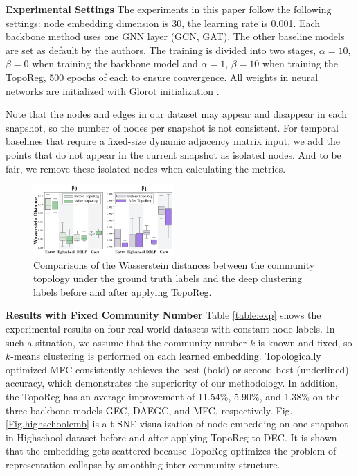 \documentclass[letterpaper]{article} %
\begin{document}
\noindent\textbf{Experimental Settings} The experiments in this paper follow the following settings: node embedding dimension is 30, the learning rate is 0.001. Each backbone method uses one GNN layer (GCN, GAT). The other baseline models are set as default by the authors. The training is divided into two stages, $\alpha=10$, $\beta=0$ when training the backbone model and $\alpha=1$, $\beta=10$ when training the TopoReg, 500 epochs of each to ensure convergence. All weights in neural networks are initialized with Glorot initialization \cite{glorotinit}.

Note that the nodes and edges in our dataset may appear and disappear in each snapshot, so the number of nodes per snapshot is not consistent. For temporal baselines that require a fixed-size dynamic adjacency matrix input, we add the points that do not appear in the current snapshot as isolated nodes. And to be fair, we remove these isolated nodes when calculating the metrics.

\begin{figure}[]
\centering %
\includegraphics[width=0.48\textwidth]{pic/boxplot_v2.pdf} %
\caption{Comparisons of the Wasserstein distances between the community topology under the ground truth labels and the deep clustering labels before and after applying TopoReg.} %
\label{Fig.topo_shift} %
\end{figure}

\noindent\textbf{Results with Fixed Community Number} Table \ref{table:exp} shows the experimental results on four real-world datasets with constant node labels. In such a situation, we assume that the community number $k$ is known and fixed, so $k$-means clustering is performed on each learned embedding. Topologically optimized MFC consistently achieves the best (bold) or second-best (underlined) accuracy, which demonstrates the superiority of our methodology. In addition, the TopoReg has an average improvement of 11.54\%, 5.90\%, and 1.38\% on the three backbone models GEC, DAEGC, and MFC, respectively. Fig. \ref{Fig.highschoolemb} is a t-SNE visualization of node embedding on one snapshot in Highschool dataset before and after applying TopoReg to DEC. It is shown that the embedding gets scattered because TopoReg optimizes the problem of representation collapse by smoothing inter-community structure.
\end{document}
